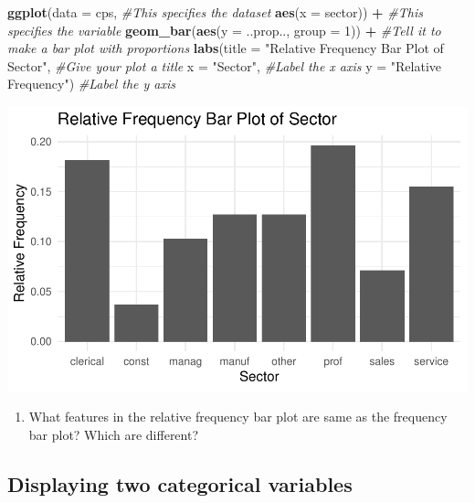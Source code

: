 \documentclass[
]{report}
\newenvironment{Shaded}{\begin{snugshade}}{\end{snugshade}}
\newcommand{\CommentTok}[1]{\textcolor[rgb]{0.56,0.35,0.01}{\textit{#1}}}
\newcommand{\DataTypeTok}[1]{\textcolor[rgb]{0.13,0.29,0.53}{#1}}
\newcommand{\DecValTok}[1]{\textcolor[rgb]{0.00,0.00,0.81}{#1}}
\newcommand{\KeywordTok}[1]{\textcolor[rgb]{0.13,0.29,0.53}{\textbf{#1}}}
\newcommand{\NormalTok}[1]{#1}
\newcommand{\OperatorTok}[1]{\textcolor[rgb]{0.81,0.36,0.00}{\textbf{#1}}}
\newcommand{\StringTok}[1]{\textcolor[rgb]{0.31,0.60,0.02}{#1}}
\providecommand{\tightlist}{%
  \setlength{\itemsep}{0pt}\setlength{\parskip}{0pt}}
\begin{document}
\begin{Shaded}
\begin{Highlighting}[]
\KeywordTok{ggplot}\NormalTok{(}\DataTypeTok{data =}\NormalTok{ cps,   }\CommentTok{\#This specifies the dataset}
       \KeywordTok{aes}\NormalTok{(}\DataTypeTok{x =}\NormalTok{ sector)) }\OperatorTok{+}\StringTok{   }\CommentTok{\#This specifies the variable}
\StringTok{  }\KeywordTok{geom\_bar}\NormalTok{(}\KeywordTok{aes}\NormalTok{(}\DataTypeTok{y =}\NormalTok{ ..prop.., }\DataTypeTok{group =} \DecValTok{1}\NormalTok{)) }\OperatorTok{+}\StringTok{  }\CommentTok{\#Tell it to make a bar plot with proportions}
\StringTok{  }\KeywordTok{labs}\NormalTok{(}\DataTypeTok{title =} \StringTok{"Relative Frequency Bar Plot of Sector"}\NormalTok{,  }\CommentTok{\#Give your plot a title}
       \DataTypeTok{x =} \StringTok{"Sector"}\NormalTok{,   }\CommentTok{\#Label the x axis}
       \DataTypeTok{y =} \StringTok{"Relative Frequency"}\NormalTok{)  }\CommentTok{\#Label the y axis}
\end{Highlighting}
\end{Shaded}

\begin{center}\includegraphics[width=0.5\linewidth]{03-EDA-categorical_files/figure-latex/unnamed-chunk-4-1} \end{center}

\begin{enumerate}
\def\labelenumi{\arabic{enumi}.}
\setcounter{enumi}{4}
\tightlist
\item
  What features in the relative frequency bar plot are same as the frequency bar plot? Which are different?
\end{enumerate}

\vspace{1in}

\hypertarget{displaying-two-categorical-variables}{%
\subsection{Displaying two categorical variables}\label{displaying-two-categorical-variables}}
\end{document}
